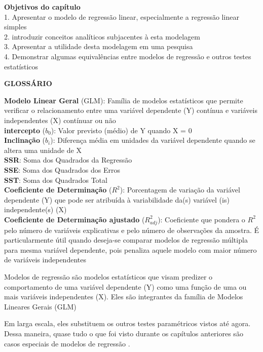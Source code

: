 \documentclass[
]{book}
\newenvironment{objectives}{
  \definecolor{shadecolor}{rgb}{0.764,0.992,0.686}  %
  \color{black}
  \begin{shaded}}
 {\end{shaded}}
\begin{document}
\begin{objectives}
\textbf{Objetivos do capítulo}\\
1. Apresentar o modelo de regressão linear, especialmente a regressão linear simples\\
2. introduzir conceitos analíticos subjacentes à esta modelagem\\
3. Apresentar a utilidade desta modelagem em uma pesquisa\\
4. Demonstrar algumas equivalências entre modelos de regressão e outros testes estatísticos

\end{objectives}

\textbf{GLOSSÁRIO}

\textbf{Modelo Linear Geral} (GLM): Família de modelos estatísticos que permite verificar o relacionamento entre uma variável dependente (Y) contínua e variáveis independentes (X) contínuar ou não\\
\textbf{intercepto} (\(b_0\)): Valor previsto (médio) de Y quando X = 0\\
\textbf{Inclinação} (\(b_i\)): Diferença média em unidades da variável dependente quando se altera uma unidade de X\\
\textbf{SSR}: Soma dos Quadrados da Regressão\\
\textbf{SSE}: Soma dos Quadrados dos Erros\\
\textbf{SST}: Soma dos Quadrados Total\\
\textbf{Coeficiente de Determinação} (\(R^2\)): Porcentagem de variação da variável dependente (Y) que pode ser atribuída à variabilidade da(s) variável (is) independente(s) (X)\\
\textbf{Coeficiente de Determinação ajustado} (\(R^2_{adj}\)): Coeficiente que pondera o \(R^2\) pelo número de variáveis explicativas e pelo número de observações da amostra. É particularmente útil quando deseja-se comparar modelos de regressão múltipla para mesma variável dependente, pois penaliza aquele modelo com maior número de variáveis independentes

Modelos de regressão são modelos estatísticos que visam predizer o comportamento de uma variável dependente (Y) como uma função de uma ou mais variáveis independentes (X). Eles são integrantes da família de Modelos Lineares Gerais (GLM)

Em larga escala, eles substituem os outros testes paramétricos vistos até agora. Dessa maneira, quase tudo o que foi visto durante os capítulos anteriores são casos especiais de modelos de regressão \citep{Chartier2008}.
\end{document}
